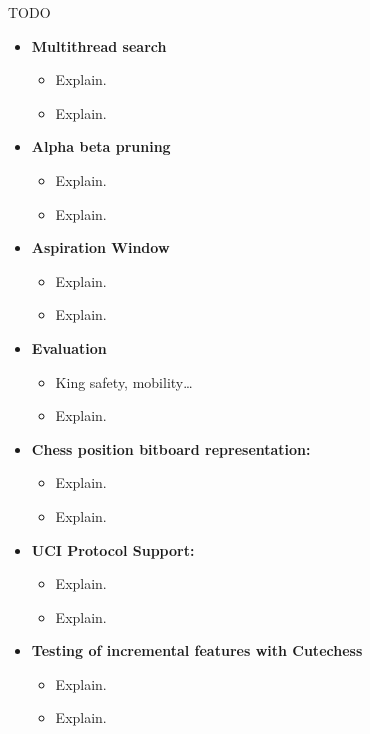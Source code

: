 TODO

\begin{itemize}
    \item \textbf{Multithread search}
    \begin{itemize}
        \item Explain.
        \item Explain.
    \end{itemize}
    
    \item \textbf{Alpha beta pruning}
    \begin{itemize}
        \item Explain.
        \item Explain.
    \end{itemize}

    \item \textbf{Aspiration Window}
    \begin{itemize}
        \item Explain.
        \item Explain.
    \end{itemize}

    \item \textbf{Evaluation}
    \begin{itemize}
        \item King safety, mobility\ldots 
        \item Explain.
    \end{itemize}

    \item \textbf{Chess position bitboard representation:}
    \begin{itemize}
        \item Explain.
        \item Explain.
    \end{itemize}

    \item \textbf{UCI Protocol Support:}
    \begin{itemize}
        \item Explain.
        \item Explain.
    \end{itemize}
  
    \item \textbf{Testing of incremental features with Cutechess}
    \begin{itemize}
        \item Explain.
        \item Explain.
    \end{itemize}


\end{itemize}
